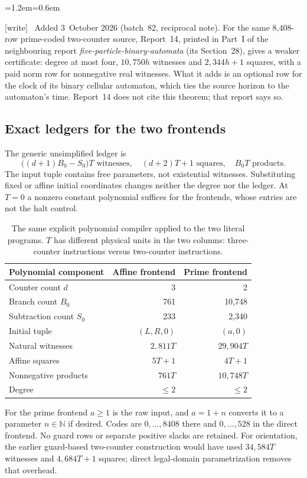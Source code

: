 \documentclass[11pt,letterpaper]{article}
\theoremstyle{definition}
\theoremstyle{remark}
\newcommand{\N}{\mathbb N}
\newcommand{\wtag}{\textup{[write]}}
\newenvironment{writenote}{\par\smallskip\begin{list}{}{\leftmargin=1.2em\rightmargin=0.6em}\item[]\small\wtag\ }{\end{list}\smallskip}
\begin{document}
\begin{writenote}
Added 3~October 2026 (batch~82, reciprocal note). For the same 8,408-row prime-coded two-counter source, Report~14, printed in Part~I of the neighbouring report \emph{five-particle-binary-automata} (its Section~28), gives a weaker certificate: degree at most four, $10{,}750h$ witnesses and $2{,}344h+1$ squares, with a paid norm row for nonnegative real witnesses. What it adds is an optional row for the clock of its binary cellular automaton, which ties the source horizon to the automaton's time. Report~14 does not cite this theorem; that report says so.
\end{writenote}


\subsection{Exact ledgers for the two frontends}
The generic unsimplified ledger is
\[
 \big((d+1)B_0-S_0\big)T\text{ witnesses},\quad
 (d+2)T+1\text{ squares},\quad B_0T\text{ products}.
\]
The input tuple contains free parameters, not existential witnesses. Substituting fixed or affine initial coordinates changes neither the degree nor the ledger. At $T=0$ a nonzero constant polynomial suffices for the frontends, whose entries are not the halt control.

\begin{table}[ht]
\centering
\begin{tabular}{lrr}
\toprule
Polynomial component & Affine frontend & Prime frontend\\\midrule
Counter count $d$ & 3 & 2\\
Branch count $B_0$ & 761 & 10,748\\
Subtraction count $S_0$ & 233 & 2,340\\
Initial tuple & $(L,R,0)$ & $(a,0)$\\
Natural witnesses & $2{,}811T$ & $29{,}904T$\\
Affine squares & $5T+1$ & $4T+1$\\
Nonnegative products & $761T$ & $10{,}748T$\\
Degree & $\leq2$ & $\leq2$\\\bottomrule
\end{tabular}
\caption{The same explicit polynomial compiler applied to the two literal programs. $T$ has different physical units in the two columns: three-counter instructions versus two-counter instructions.}\label{qoc:um:tab:quadratic}
\end{table}
For the prime frontend $a\geq1$ is the raw input, and $a=1+n$ converts it to a parameter $n\in\N$ if desired. Codes are $0,\ldots,8408$ there and $0,\ldots,528$ in the direct frontend. No guard rows or separate positive slacks are retained. For orientation, the earlier guard-based two-counter construction would have used $34{,}584T$ witnesses and $4{,}684T+1$ squares; direct legal-domain parametrization removes that overhead.
\end{document}
